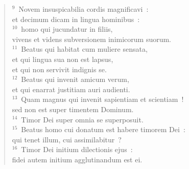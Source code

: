 \begin{flushleft}\begin{verse}${}^{9}$~Novem insuspicabilia cordis magnificavi~:\\ et decimum dicam in lingua hominibus~:\\
${}^{10}$~homo qui jucundatur in filiis,\\ vivens et videns subversionem inimicorum suorum.\\
${}^{11}$~Beatus qui habitat cum muliere sensata,\\ et qui lingua sua non est lapsus,\\ et qui non servivit indignis se.\\
${}^{12}$~Beatus qui invenit amicum verum,\\ et qui enarrat justitiam auri audienti.\\
${}^{13}$~Quam magnus qui invenit sapientiam et scientiam~!\\ sed non est super timentem Dominum.\\
${}^{14}$~Timor Dei super omnia se superposuit.\\
${}^{15}$~Beatus homo cui donatum est habere timorem Dei~:\\ qui tenet illum, cui assimilabitur~?\\
${}^{16}$~Timor Dei initium dilectionis ejus~:\\ fidei autem initium agglutinandum est ei.\end{verse}\end{flushleft}



